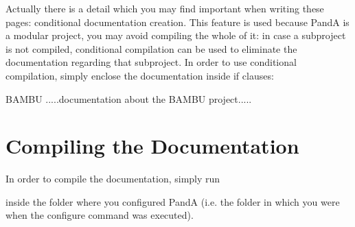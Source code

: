 Actually there is a detail which you may find important when writing these pages\+: conditional documentation creation. This feature is used because PandA is a modular project, you may avoid compiling the whole of it\+: in case a subproject is not compiled, conditional compilation can be used to eliminate the documentation regarding that subproject. In order to use conditional compilation, simply enclose the documentation inside {\ttfamily if} clauses\+: \begin{DoxyVerb}\if BAMBU
.....documentation about the BAMBU project.....
\endif
\end{DoxyVerb}
\hypertarget{documentation_how_to_doc_compilation_how_to}{}\section{Compiling the Documentation}\label{documentation_how_to_doc_compilation_how_to}
In order to compile the documentation, simply run 
 inside the folder where you configured PandA (i.\+e. the folder in which you were when the {\ttfamily configure} command was executed). 